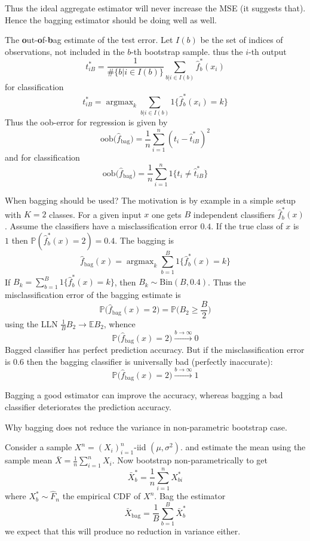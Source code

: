 \documentclass[a4paper]{article}
\newcommand{\ex}{\mathbb{E}}
\newcommand{\pr}[0]{{\mathbb{P}}}
\newcommand{\argmax}{\mathop{\text{argmax}}}
\begin{document}
Thus the ideal aggregate estimator will never increase the MSE (it suggests that).
Hence the bagging estimator should be doing well as well.

The \textbf{o}ut-\textbf{o}f-\textbf{b}ag estimate of the test error. Let $I(b)$
be the set of indices of observations, not included in the $b$-th bootstrap sample.
thus the $i$-th output
\[
t^*_{iB} = \frac{1}{\#\{b \rvert i\in I(b)\}} \sum_{b \rvert i\in I(b)} \hat{f}^*_b(x_i)
\]
for classification 
\[
t^*_{iB} = \argmax_k \sum_{b \rvert i\in I(b)} 1\{\hat{f}^*_b(x_i) = k\}
\]
Thus the oob-error for regression is given by
\[
\text{oob}\bigl(\hat{f}_{\text{bag}}\bigr)
= \frac{1}{n} \sum_{i=1}^n (t_i - \hat{t}^*_{iB})^2
\]
and for classification
\[
\text{oob}\bigl(\hat{f}_{\text{bag}}\bigr)
= \frac{1}{n} \sum_{i=1}^n 1\{t_i \neq \hat{t}^*_{iB}\}
\]

When bagging should be used? The motivation is by example in a simple setup
with $K=2$ classes. For a given input $x$ one gets $B$ independent classifiers
$\hat{f}^*_b(x)$. Assume the classifiers have a misclassification error $0.4$.
If the true class of $x$ is $1$ then $\pr(\hat{f}^*_b(x) = 2) = 0.4$. The bagging
is 
\[
\hat{f}_\text{bag}(x)
= \argmax_k \sum_{b=1}^B 1\{\hat{f}^*_b(x) = k\}
\]
If $B_k = \sum_{b=1}^B 1\{\hat{f}^*_b(x) = k\}$, then $B_k\sim\text{Bin}(B, 0.4)$. Thus
the misclassification error of the bagging estimate is 
\[\pr\bigl(\hat{f}_\text{bag}(x) = 2\bigr) = \pr\bigl(B_2\geq \frac{B}{2}\bigr)\]
using the LLN $\frac{1}{B} B_2 \to \ex B_2$, whence
\[\pr\bigl(\hat{f}_\text{bag}(x) = 2\bigr) \overset{b\to \infty}{\to} 0\]
Bagged classifier has perfect prediction accuracy. But if the misclassification error is
$0.6$ then the bagging classifier is universally bad (perfectly inaccurate):
\[\pr\bigl(\hat{f}_\text{bag}(x) = 2\bigr) \overset{b\to \infty}{\to} 1\]

Bagging a good estimator can improve the accuracy, whereas bagging a bad classifier
deteriorates the prediction accuracy.

Why bagging does not reduce the variance in non-parametric bootstrap case.

Consider a sample $X^n = (X_i)_{i=1}^n$-iid $(\mu, \sigma^2)$. and estimate the mean using
the sample mean $\bar{X} = \frac{1}{n}\sum_{i=1}^n X_i$. Now bootstrap non-parametrically
to get
\[\bar{X}^*_b = \frac{1}{n} \sum_{i=1}^n X^*_{bi} \]
where $X^*_b\sim \hat{F}_n$ the empirical CDF of $X^n$. Bag the estimator
\[
\bar{X}_{\text{bag}} = \frac{1}{B}\sum_{b=1}^B \bar{X}^*_b
\]
we expect that this will produce no reduction in variance either.
\end{document}

